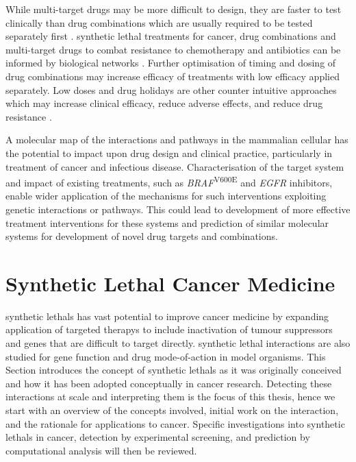 While multi-target drugs may be more difficult to design, they are faster to test clinically than drug combinations which are usually required to be tested separately first \citep{Hopkins2008}. \Gls{synthetic lethal} \glspl{treatment} for cancer, drug combinations and multi-target drugs to combat resistance to \gls{chemotherapy} and antibiotics can be informed by biological networks \citep{Hopkins2008, Barabasi2004}. Further optimisation of timing and dosing of drug combinations may increase efficacy of \glspl{treatment} with low efficacy applied separately. Low doses and drug holidays are other counter intuitive approaches which may increase clinical efficacy, reduce adverse effects, and reduce drug resistance \citep{Sun2014, Tsai2012}.  

A molecular map of the interactions and \glspl{pathway} in the mammalian cellular  has the potential to impact upon drug design and clinical practice, particularly in treatment of cancer and infectious disease. Characterisation of the target system and impact of existing \glspl{treatment}, such as  \textit{BRAF}\textsuperscript{V600E} and \textit{EGFR} inhibitors, enable wider application of the mechanisms for such interventions exploiting genetic interactions or \glspl{pathway}. This could lead to development of more effective treatment interventions for these systems and prediction of similar molecular systems for development of novel drug targets and combinations.  
\fi


\section{Synthetic Lethal Cancer Medicine}

\Glspl{synthetic lethal} has vast potential to improve cancer medicine by expanding application of \glspl{targeted therapy} to include inactivation of \glspl{tumour suppressor} and genes that are difficult to target directly. \Gls{synthetic lethal} interactions are also studied for gene function and drug mode-of-action in model organisms. This Section introduces the concept of \glspl{synthetic lethal} as it was originally conceived and how it has been adopted conceptually in cancer research. Detecting these interactions at scale and interpreting them is the focus of this thesis, hence we start with an overview of the concepts involved, initial work on the interaction, and the rationale for applications to cancer. Specific investigations into \glspl{synthetic lethal} in cancer, detection by experimental screening, and prediction by computational analysis will then be reviewed.


